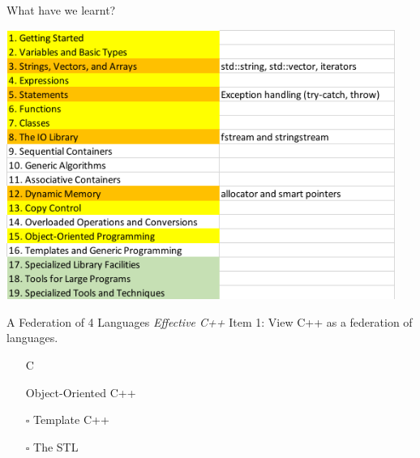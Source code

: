 \begin{frame}{What have we learnt?}
    \begin{center}
        \includegraphics[width=0.95\textwidth]{figures/contents.png}
    \end{center}
\end{frame}

\begin{frame}{A Federation of 4 Languages}
    \textit{Effective C++} Item 1: View C++ as a federation of languages.
    \begin{itemize}
        \item[\done] C
        \item[\done] Object-Oriented C++
        \item[\(\square\)] Template C++
        \item[\(\square\)] The STL
    \end{itemize}
\end{frame}